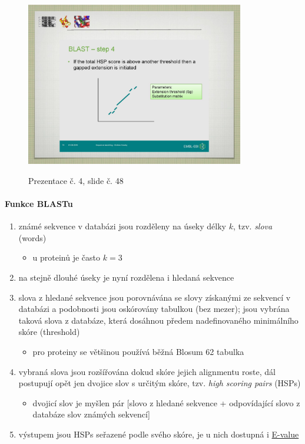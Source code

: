 \documentclass[DIV=8]{scrreprt}
\begin{document}
\begin{figure}
    \caption{Prezentace č. 4, slide č. 48}
    \includegraphics[width=0.85\textwidth]{slides-4/slide-48.jpg}
    \centering
    \label{slides-4-slide-48}
\end{figure}

\paragraph{Funkce BLASTu}
\begin{enumerate}[nosep]
    \item známé sekvence v databázi jsou rozděleny na úseky délky \(k\), tzv. \emph{slova} (words)
\begin{itemize}[nosep]
    \item u proteinů je často \(k = 3\)
\end{itemize}

    \item na stejně dlouhé úseky je nyní rozdělena i hledaná sekvence
    \item slova z hledané sekvence jsou porovnávána se slovy získanými ze sekvencí v databázi a podobnosti jsou oskórovány tabulkou (bez mezer); jsou vybrána taková slova z databáze, která dosáhnou předem nadefinovaného minimálního skóre (threshold)
\begin{itemize}[nosep]
    \item pro proteiny se většinou používá běžná Blosum 62 tabulka
\end{itemize}

    \item vybraná slova jsou rozšířována dokud skóre jejich alignmentu roste, dál postupují opět jen dvojice slov s určitým skóre, tzv. \emph{high scoring pairs} (HSPs)
\begin{itemize}[nosep]
    \item dvojicí slov je myšlen pár [slovo z hledané sekvence + odpovídající slovo z databáze slov známých sekvencí]
\end{itemize}

    \item výstupem jsou HSPs seřazené podle svého skóre, je u nich dostupná i \hyperref[Parametry významnosti alignmentu]{E-value}
\end{enumerate}
\end{document}
